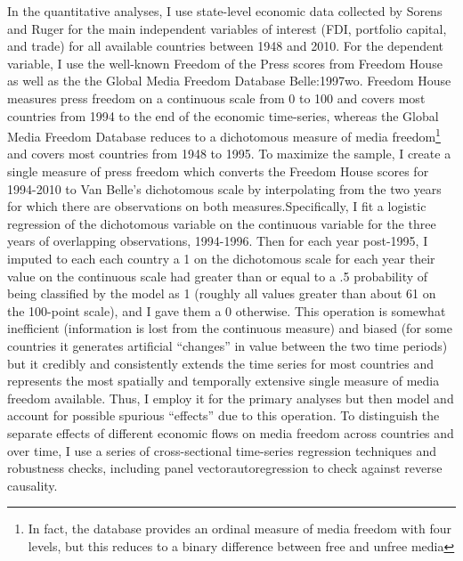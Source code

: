 \documentclass[12pt,a4paper]{article}\usepackage[]{graphicx}\usepackage[]{color}
\begin{document}
In the quantitative analyses, I use state-level economic data collected by Sorens and Ruger \parencite*{Sorens:2012hc} for the main independent variables of interest (FDI, portfolio capital, and trade) for all available countries between 1948 and 2010. For the dependent variable, I use the well-known Freedom of the Press scores from Freedom House \parencite*{FreedomHouse:2011vv} as well as the the Global Media Freedom Database \parencite{van2000press}{Belle:1997wo}. Freedom House measures press freedom on a continuous scale from 0 to 100 and covers most countries from 1994 to the end of the economic time-series, whereas the Global Media Freedom Database reduces to a dichotomous measure of media freedom\footnote{In fact, the database provides an ordinal measure of media freedom with four levels, but this reduces to a binary difference between free and unfree media} and covers most countries from 1948 to 1995. To maximize the sample, I create a single measure of press freedom which converts the Freedom House scores for 1994-2010 to Van Belle's dichotomous scale by interpolating from the two years for which there are observations on both measures.Specifically, I fit a logistic regression of the dichotomous variable on the continuous variable for the three years of overlapping observations, 1994-1996. Then for each year post-1995, I imputed to each each country a 1 on the dichotomous scale for each year their value on the continuous scale had greater than or equal to a .5 probability of being classified by the model as 1 (roughly all values greater than about 61 on the 100-point scale), and I gave them a 0 otherwise. This operation is somewhat inefficient (information is lost from the continuous measure) and biased (for some countries it generates artificial “changes” in value between the two time periods) but it credibly and consistently extends the time series for most countries and represents the most spatially and temporally extensive single measure of media freedom available. Thus, I employ it for the primary analyses but then model and account for possible spurious “effects” due to this operation. To distinguish the separate effects of different economic flows on media freedom across countries and over time, I use a series of cross-sectional time-series regression techniques and robustness checks, including panel vectorautoregression to check against reverse causality.
\end{document}
